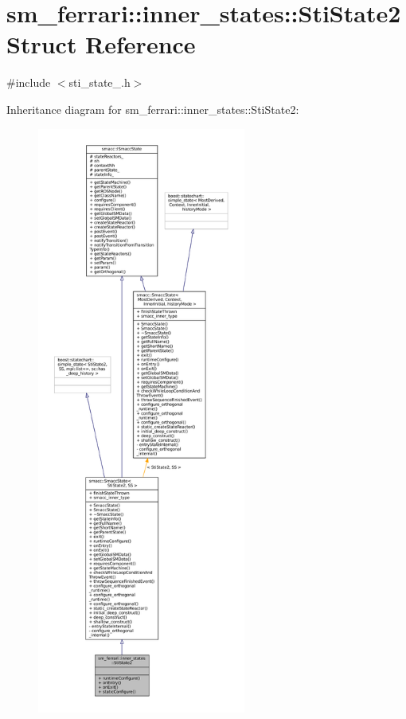 \hypertarget{structsm__ferrari_1_1inner__states_1_1StiState2}{}\section{sm\+\_\+ferrari\+:\+:inner\+\_\+states\+:\+:Sti\+State2 Struct Reference}
\label{structsm__ferrari_1_1inner__states_1_1StiState2}


{\ttfamily \#include $<$sti\+\_\+state\+\_.\+h$>$}



Inheritance diagram for sm\+\_\+ferrari\+:\+:inner\+\_\+states\+:\+:Sti\+State2\+:
\nopagebreak
\begin{figure}[H]
\begin{center}
\leavevmode
\includegraphics[height=550pt]{structsm__ferrari_1_1inner__states_1_1StiState2__inherit__graph}
\end{center}
\end{figure}


